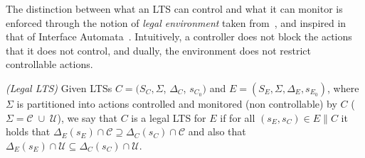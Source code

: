 The distinction between what an LTS can control and what it can monitor is enforced through the notion of 
{\em legal environment} taken from~\cite{DIppolito:2013}, and inspired in that of Interface Automata~\cite{DBLP:conf/sigsoft/AlfaroH01}.
Intuitively, a controller does not block the actions that it does not control, and dually, the environment does not restrict controllable actions. 

\begin{definition} \label{def:IALTS} \emph{(Legal LTS)}
Given LTSs $C = (S_C, \Sigma$, $\Delta_C$, $s_{C_0})$ and $E = (S_E,\Sigma,\Delta_E,s_{E_0})$, where $\Sigma$ is partitioned into actions controlled and monitored (non controllable) by $C$ ($\Sigma=\mathcal{C} \; \cup \;\mathcal{U}$), we say that $C$ is a legal LTS for $E$ if for all $(s_E,s_C) \in E\|C$ it holds that
$\Delta_{E}(s_E)\cap \mathcal{C} \supseteq \Delta_{C}(s_C)\cap \mathcal{C}$ and also that  $\Delta_{E}(s_E)\cap \mathcal{U} \subseteq \Delta_{C}(s_C)\cap \mathcal{U}$.

\end{definition}





